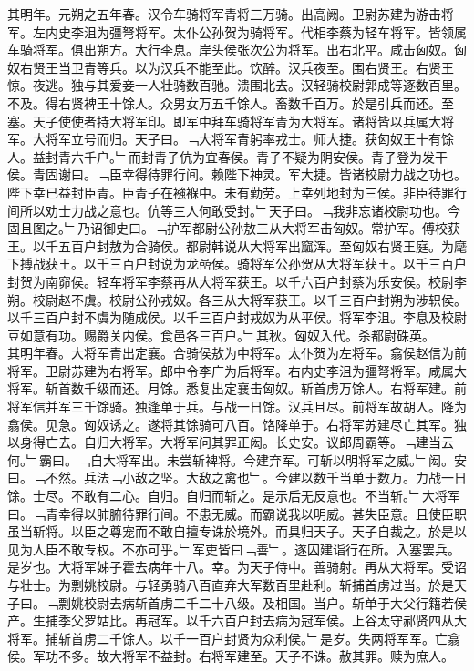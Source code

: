 \documentclass{zhvt-classic}
\begin{document}
\hspace*{2em}其明年。元朔之五年春。汉令车骑将军青将三万骑。出高阙。卫尉苏建为游击将军。左内史李沮为彊弩将军。太仆公孙贺为骑将军。代相李蔡为轻车将军。皆领属车骑将军。俱出朔方。大行李息。岸头侯张次公为将军。出右北平。咸击匈奴。匈奴右贤王当卫青等兵。以为汉兵不能至此。饮醉。汉兵夜至。围右贤王。右贤王惊。夜逃。独与其爱妾一人壮骑数百驰。溃围北去。汉轻骑校尉郭成等逐数百里。不及。得右贤裨王十馀人。众男女万五千馀人。畜数千百万。於是引兵而还。至塞。天子使使者持大将军印。即军中拜车骑将军青为大将军。诸将皆以兵属大将军。大将军立号而归。天子曰。﹁大将军青躬率戎士。师大捷。获匈奴王十有馀人。益封青六千户。﹂而封青子伉为宜春侯。青子不疑为阴安侯。青子登为发干侯。青固谢曰。﹁臣幸得待罪行间。赖陛下神灵。军大捷。皆诸校尉力战之功也。陛下幸已益封臣青。臣青子在襁褓中。未有勤劳。上幸列地封为三侯。非臣待罪行间所以劝士力战之意也。伉等三人何敢受封。﹂天子曰。﹁我非忘诸校尉功也。今固且图之。﹂乃诏御史曰。﹁护军都尉公孙敖三从大将军击匈奴。常护军。傅校获王。以千五百户封敖为合骑侯。都尉韩说从大将军出窳浑。至匈奴右贤王庭。为麾下搏战获王。以千三百户封说为龙嵒侯。骑将军公孙贺从大将军获王。以千三百户封贺为南窌侯。轻车将军李蔡再从大将军获王。以千六百户封蔡为乐安侯。校尉李朔。校尉赵不虞。校尉公孙戎奴。各三从大将军获王。以千三百户封朔为涉轵侯。以千三百户封不虞为随成侯。以千三百户封戎奴为从平侯。将军李沮。李息及校尉豆如意有功。赐爵关内侯。食邑各三百户。﹂其秋。匈奴入代。杀都尉硃英。\\
\hspace*{2em}其明年春。大将军青出定襄。合骑侯敖为中将军。太仆贺为左将军。翕侯赵信为前将军。卫尉苏建为右将军。郎中令李广为后将军。右内史李沮为彊弩将军。咸属大将军。斩首数千级而还。月馀。悉复出定襄击匈奴。斩首虏万馀人。右将军建。前将军信并军三千馀骑。独逢单于兵。与战一日馀。汉兵且尽。前将军故胡人。降为翕侯。见急。匈奴诱之。遂将其馀骑可八百。饹降单于。右将军苏建尽亡其军。独以身得亡去。自归大将军。大将军问其罪正闳。长史安。议郎周霸等。﹁建当云何。﹂霸曰。﹁自大将军出。未尝斩裨将。今建弃军。可斩以明将军之威。﹂闳。安曰。﹁不然。兵法﹁小敌之坚。大敌之禽也﹂。今建以数千当单于数万。力战一日馀。士尽。不敢有二心。自归。自归而斩之。是示后无反意也。不当斩。﹂大将军曰。﹁青幸得以肺腑待罪行间。不患无威。而霸说我以明威。甚失臣意。且使臣职虽当斩将。以臣之尊宠而不敢自擅专诛於境外。而具归天子。天子自裁之。於是以见为人臣不敢专权。不亦可乎。﹂军吏皆曰﹁善﹂。遂囚建诣行在所。入塞罢兵。\\
\hspace*{2em}是岁也。大将军姊子霍去病年十八。幸。为天子侍中。善骑射。再从大将军。受诏与壮士。为剽姚校尉。与轻勇骑八百直弃大军数百里赴利。斩捕首虏过当。於是天子曰。﹁剽姚校尉去病斩首虏二千二十八级。及相国。当户。斩单于大父行籍若侯产。生捕季父罗姑比。再冠军。以千六百户封去病为冠军侯。上谷太守郝贤四从大将军。捕斩首虏二千馀人。以千一百户封贤为众利侯。﹂是岁。失两将军军。亡翕侯。军功不多。故大将军不益封。右将军建至。天子不诛。赦其罪。赎为庶人。\\
\end{document}
